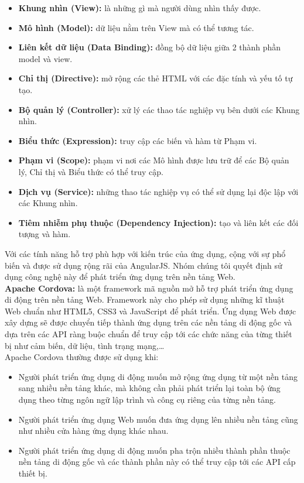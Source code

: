 \documentclass[12pt,a4paper,oneside]{extbook}
\begin{document}
\begin{itemize}[topsep=1mm,itemsep=-0.5mm]
\item \textbf{Khung nhìn (View):} là những gì mà người dùng nhìn thấy được.
\item \textbf{Mô hình (Model):} dữ liệu nằm trên View mà có thể tương tác.
\item \textbf{Liên kết dữ liệu (Data Binding):} đồng bộ dữ liệu giữa 2 thành phần model và view.
\item \textbf{Chỉ thị (Directive):} mở rộng các thẻ HTML với các đặc tính và yếu tố tự tạo.
\item \textbf{Bộ quản lý (Controller):} xử lý các thao tác nghiệp vụ bên dưới các Khung nhìn.
\item \textbf{Biểu thức (Expression):} truy cập các biến và hàm từ Phạm vi.
\item \textbf{Phạm vi (Scope):} phạm vi nơi các Mô hình được lưu trữ để các Bộ quản lý, Chỉ thị và Biểu thức có thể truy cập.
\item \textbf{Dịch vụ (Service):} những thao tác nghiệp vụ có thể sử dụng lại độc lập với các Khung nhìn.
\item \textbf{Tiêm nhiễm phụ thuộc (Dependency Injection):} tạo và liên kết các đối tượng và hàm.
\vspace{1mm}
\end{itemize}

\noindent
Với các tính năng hỗ trợ phù hợp với kiến trúc của ứng dụng, cộng với sự phổ biến và được sử dụng rộng rãi của AngularJS. Nhóm chúng tôi quyết định sử dụng công nghệ này để phát triển ứng dụng trên nền tảng Web.\\

\noindent
\textbf{Apache Cordova:} là một framework mã nguồn mở hỗ trợ phát triển ứng dụng di động trên nền tảng Web. Framework này cho phép sử dụng những kĩ thuật Web chuẩn như HTML5, CSS3 và JavaScript để phát triển. Ứng dụng Web được xây dựng sẽ được chuyển tiếp thành ứng dụng trên các nền tảng di động gốc và dựa trên các API ràng buộc chuẩn để truy cập tới các chức năng của từng thiết bị như cảm biến, dữ liệu, tình trạng mạng,\dots\\

\noindent
Apache Cordova thường được sử dụng khi:

\begin{itemize}[topsep=1mm,itemsep=-0.5mm]
\item Người phát triển ứng dụng di động muốn mở rộng ứng dụng từ một nền tảng sang nhiều nền tảng khác, mà không cần phải phát triển lại toàn bộ ứng dụng theo từng ngôn ngữ lập trình và công cụ riêng của từng nền tảng.
\item Người phát triển ứng dụng Web muốn đưa ứng dụng lên nhiều nền tảng cũng như nhiều cửa hàng ứng dụng khác nhau.
\item Người phát triển ứng dụng di động muốn pha trộn nhiều thành phần thuộc nền tảng di động gốc và các thành phần này có thể  truy cập tới các API cấp thiết bị.
\vspace{1mm}
\end{itemize}
\end{document}
